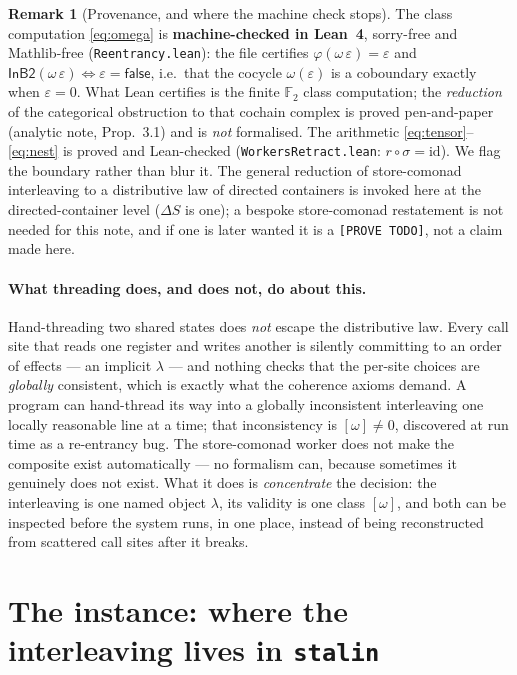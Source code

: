 \documentclass[11pt]{article}
\theoremstyle{plain}
\theoremstyle{definition}
\newtheorem{remark}{Remark}
\begin{document}
\begin{remark}[Provenance, and where the machine check stops]\label{rem:prov}
The class computation \eqref{eq:omega} is \textbf{machine-checked in Lean~4}, sorry-free and
Mathlib-free (\texttt{Reentrancy.lean}): the file certifies $\varphi(\omega\,\varepsilon)=\varepsilon$
and $\mathsf{InB2}(\omega\,\varepsilon)\Leftrightarrow\varepsilon=\mathsf{false}$, i.e.\ that the
cocycle $\omega(\varepsilon)$ is a coboundary exactly when $\varepsilon=0$. What Lean certifies is the
finite $\mathbb{F}_2$ class computation; the \emph{reduction} of the categorical obstruction to that
cochain complex is proved pen-and-paper (analytic note, Prop.~3.1) and is \emph{not} formalised. The
arithmetic \eqref{eq:tensor}--\eqref{eq:nest} is proved and Lean-checked (\texttt{WorkersRetract.lean}:
$r\circ\sigma=\mathrm{id}$). We flag the boundary rather than blur it. The general reduction of
store-comonad interleaving to a distributive law of directed containers is invoked here at the
directed-container level ($\Delta S$ is one); a bespoke store-comonad restatement is not needed for
this note, and if one is later wanted it is a \texttt{[PROVE TODO]}, not a claim made here.
\end{remark}

\paragraph{What threading does, and does not, do about this.} Hand-threading two shared states does
\emph{not} escape the distributive law. Every call site that reads one register and writes another is
silently committing to an order of effects --- an implicit $\lambda$ --- and nothing checks that the
per-site choices are \emph{globally} consistent, which is exactly what the coherence axioms demand. A
program can hand-thread its way into a globally inconsistent interleaving one locally reasonable line
at a time; that inconsistency is $[\omega]\neq0$, discovered at run time as a re-entrancy bug. The
store-comonad worker does not make the composite exist automatically --- no formalism can, because
sometimes it genuinely does not exist. What it does is \emph{concentrate} the decision: the
interleaving is one named object $\lambda$, its validity is one class $[\omega]$, and both can be
inspected before the system runs, in one place, instead of being reconstructed from scattered call
sites after it breaks.

\section{The instance: where the interleaving lives in \texttt{stalin}}\label{sec:stalin}
\end{document}
